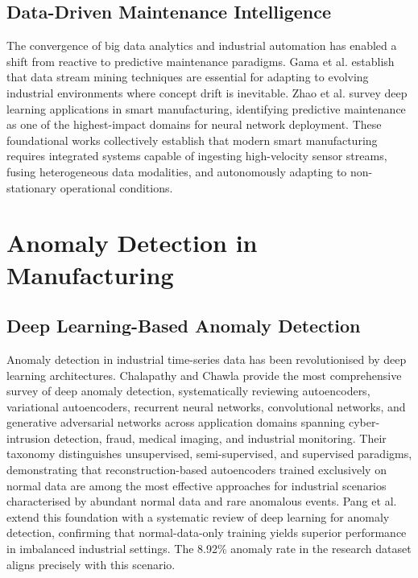 \subsection{Data-Driven Maintenance Intelligence}

The convergence of big data analytics and industrial automation has enabled a shift from reactive to predictive maintenance paradigms. Gama et al. \cite{Gama2014} establish that data stream mining techniques are essential for adapting to evolving industrial environments where concept drift is inevitable. Zhao et al. \cite{Zhao2019} survey deep learning applications in smart manufacturing, identifying predictive maintenance as one of the highest-impact domains for neural network deployment. These foundational works collectively establish that modern smart manufacturing requires integrated systems capable of ingesting high-velocity sensor streams, fusing heterogeneous data modalities, and autonomously adapting to non-stationary operational conditions.

\section{Anomaly Detection in Manufacturing}



\subsection{Deep Learning-Based Anomaly Detection}

Anomaly detection in industrial time-series data has been revolutionised by deep learning architectures. Chalapathy and Chawla \cite{Chalapathy2019} provide the most comprehensive survey of deep anomaly detection, systematically reviewing autoencoders, variational autoencoders, recurrent neural networks, convolutional networks, and generative adversarial networks across application domains spanning cyber-intrusion detection, fraud, medical imaging, and industrial monitoring. Their taxonomy distinguishes unsupervised, semi-supervised, and supervised paradigms, demonstrating that reconstruction-based autoencoders trained exclusively on normal data are among the most effective approaches for industrial scenarios characterised by abundant normal data and rare anomalous events. Pang et al. \cite{pang_deep_2021} extend this foundation with a systematic review of deep learning for anomaly detection, confirming that normal-data-only training yields superior performance in imbalanced industrial settings. The 8.92\% anomaly rate in the research dataset aligns precisely with this scenario.

